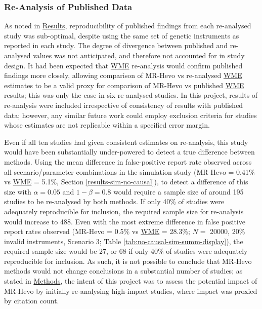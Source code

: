 \documentclass[
]{article}
\begin{document}
\subsubsection{Re-Analysis of Published Data}\label{lim-cite}

As noted in \hyperref[results]{Results}, reproducibility of published findings from each re-analysed study was sub-optimal, despite using the same set of genetic instruments as reported in each study. The degree of divergence between published and re-analysed values was not anticipated, and therefore not accounted for in study design. It had been expected that \hyperref[acronyms_WME]{WME} re-analysis would confirm published findings more closely, allowing comparison of MR-Hevo vs re-analysed \hyperref[acronyms_WME]{WME} estimates to be a valid proxy for comparison of MR-Hevo vs published \hyperref[acronyms_WME]{WME} results; this was only the case in six re-analysed studies. In this project, results of re-analysis were included irrespective of consistency of results with published data; however, any similar future work could employ exclusion criteria for studies whose estimates are not replicable within a specified error margin.

Even if all ten studies had given consistent estimates on re-analysis, this study would have been substantially under-powered to detect a true difference between methods. Using the mean difference in false-positive report rate observed across all scenario/parameter combinations in the simulation study (MR-Hevo = 0.41\% vs \hyperref[acronyms_WME]{WME} = 5.1\%, Section \ref{results-sim-no-causal}), to detect a difference of this size with \(\alpha = 0.05\) and \(1 - \beta = 0.8\) would require a sample size of around 195 studies to be re-analysed by both methods. If only 40\% of studies were adequately reproducible for inclusion, the required sample size for re-analysis would increase to 488. Even with the most extreme difference in false positive report rates observed (MR-Hevo = 0.5\% vs \hyperref[acronyms_WME]{WME} = 28.3\%; \(N =\) 20000, 20\% invalid instruments, Scenario 3; Table \ref{tab:no-causal-sim-summ-display}), the required sample size would be 27, or 68 if only 40\% of studies were adequately reproducible for inclusion. As such, it is not possible to conclude that MR-Hevo methods would not change conclusions in a substantial number of studies; as stated in \hyperref[methods]{Methods}, the intent of this project was to assess the potential impact of MR-Hevo by initially re-analysing high-impact studies, where impact was proxied by citation count.
\end{document}
